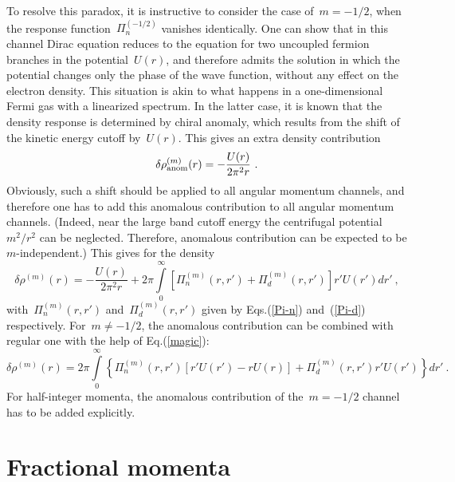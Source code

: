\documentclass[preprint,aps,prb]{revtex4}
\begin{document}
To resolve this paradox, it is instructive to consider the case of~$m
= -1/2$, when the response function~$\Pi_n^{(-1/2)}$ vanishes
identically. One can show that in this channel Dirac equation reduces
to the equation for two uncoupled fermion branches in the potential~$U(r)$, 
and therefore 
admits the solution in which the potential changes only the phase of 
the wave function, without any effect on the electron density. 
This situation is akin to what happens in a one-dimensional Fermi gas
with a linearized spectrum. In the latter case, it is known that the
density response is determined by chiral anomaly, which results from 
the shift of the kinetic energy cutoff by~$U(r)$. This gives an extra density 
contribution
\begin{equation}
\delta \rho_{\rm anom}^{(m)}(r)  = - \frac{U(r)}{2\pi^2 r}
\ .
\end{equation}
Obviously, such a shift should be applied to all angular momentum
channels, and therefore one has to add this anomalous contribution
to all angular momentum channels. (Indeed, near the large band cutoff
energy the centrifugal potential~$m^2/r^2$ can be neglected.
Therefore, anomalous contribution can be expected to be $m$-independent.) 
This gives for the density
\begin{equation}
\delta \rho^{(m)}(r) = - \frac{U(r)}{2\pi^2 r} 
+ 2\pi \int\limits_{0}^{\infty} 
  \left[\Pi_n^{(m)}(r, r') + \Pi_d^{(m)}(r, r')\right] r' U(r') dr' 
\ , 
\end{equation}
with~$\Pi_n^{(m)}(r, r')$ and~$\Pi_d^{(m)}(r, r')$ given by
Eqs.(\ref{Pi-n}) and~(\ref{Pi-d}) respectively. For~$m \neq -1/2$, 
the anomalous contribution can be combined with regular one
with the help of Eq.(\ref{magic}):
\begin{equation}
\delta \rho^{(m)}(r) = 
 2\pi \int\limits_{0}^{\infty} 
  \left\{ \Pi_n^{(m)}(r, r') \left[ r'U(r') - rU(r) \right] 
  + \Pi_d^{(m)}(r, r')r' U(r')\right\}  dr' 
\ .
\end{equation}
For half-integer momenta, the anomalous contribution of the~$m = -1/2$
channel has to be added explicitly.

\section{Fractional momenta}
\end{document}
